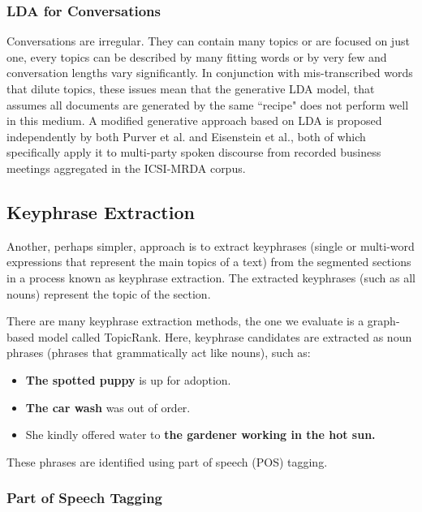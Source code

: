     \subsubsection{LDA for Conversations \label{sssec: lda for conversations}}
    Conversations are irregular. They can contain many topics or are focused on just one, every topics can be described by many fitting words or by very few and conversation lengths vary significantly. In conjunction with mis-transcribed words that dilute topics, these issues mean that the generative LDA model, that assumes all documents are generated by the same ``recipe" does not perform well in this medium\cite{purver2006unsupervised, tang2014understanding}. A modified generative approach based on LDA is proposed independently by both Purver et al.\cite{purver2006unsupervised} and Eisenstein et al.\cite{eisenstein2008bayesian}, both of which specifically apply it to multi-party spoken discourse from recorded business meetings aggregated in the ICSI-MRDA corpus\cite{shriberg2004icsi}.
    
    \subsection{Keyphrase Extraction \label{ssec: keyphrase extraction}}
    Another, perhaps simpler, approach is to extract keyphrases (single or multi-word expressions that represent the main topics of a text) from the segmented sections in a process known as keyphrase extraction\cite{hasan2014automatic}. The extracted keyphrases (such as all nouns) represent the topic of the section.
    
    There are many keyphrase extraction methods, the one we evaluate is a graph-based model called TopicRank\cite{bougouin-etal-2013-topicrank}. Here, keyphrase candidates are extracted as noun phrases (phrases that grammatically act like nouns), such as:
    
    \begin{itemize}
        \item \textbf{The spotted puppy} is up for adoption.
        \item \textbf{The car wash} was out of order.
        \item She kindly offered water to \textbf{the gardener working in the hot sun.}
    \end{itemize}
    
    These phrases are identified using part of speech (POS) tagging.
        \subsubsection{Part of Speech Tagging \label{sssec: POS tagging}}
        
